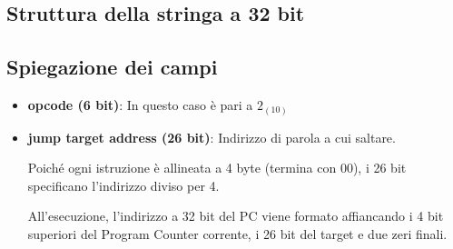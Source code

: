 \subsection{Struttura della stringa a 32 bit}
\begin{center}
\end{center}

\subsection{Spiegazione dei campi}
\begin{itemize}
    \item \textbf{opcode (6 bit)}: In questo caso è pari a $2_{(10)}$
    \item \textbf{jump target address (26 bit)}: Indirizzo di parola a cui saltare. 
        
    Poiché ogni istruzione è allineata a 4 byte (termina con 00), i 26 bit specificano l'indirizzo diviso per 4. 

    All'esecuzione, l'indirizzo a 32 bit del PC viene formato affiancando i 4 bit superiori del Program Counter corrente, i 26 bit del target e due zeri finali.
\end{itemize}
